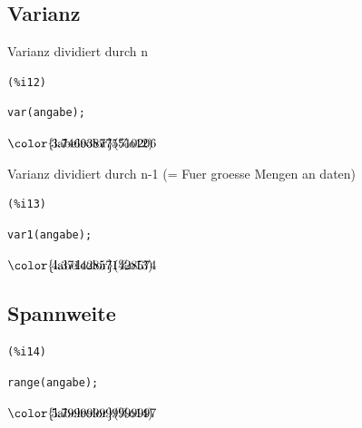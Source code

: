 \documentclass[12pt]{article}
\begin{document}
\subsection{Varianz}


Varianz dividiert durch n

\noindent
\begin{minipage}[t]{8ex}{\color{red}\bf
\begin{verbatim}
(%i12) 
\end{verbatim}}
\end{minipage}
\begin{minipage}[t]{\textwidth}{\color{blue}
\begin{verbatim}
var(angabe);
\end{verbatim}}
\end{minipage}
\begin{math}\displaystyle
\parbox{8ex}{\color{labelcolor}(\%o12) }
3.746938775510206
\end{math}

Varianz dividiert durch n-1 (= Fuer groesse Mengen an daten)

\noindent
\begin{minipage}[t]{8ex}{\color{red}\bf
\begin{verbatim}
(%i13) 
\end{verbatim}}
\end{minipage}
\begin{minipage}[t]{\textwidth}{\color{blue}
\begin{verbatim}
var1(angabe);
\end{verbatim}}
\end{minipage}
\begin{math}\displaystyle
\parbox{8ex}{\color{labelcolor}(\%o13) }
4.371428571428574
\end{math}


\subsection{Spannweite}



\noindent
\begin{minipage}[t]{8ex}{\color{red}\bf
\begin{verbatim}
(%i14) 
\end{verbatim}}
\end{minipage}
\begin{minipage}[t]{\textwidth}{\color{blue}
\begin{verbatim}
range(angabe);
\end{verbatim}}
\end{minipage}
\begin{math}\displaystyle
\parbox{8ex}{\color{labelcolor}(\%o14) }
5.799999999999997
\end{math}
\end{document}
